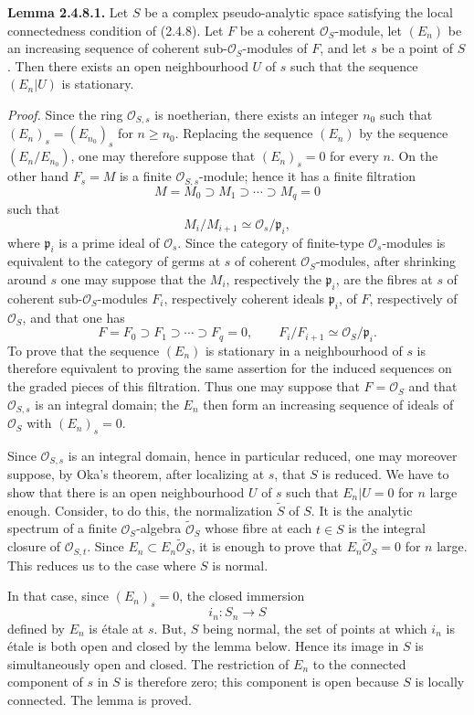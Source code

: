 \textbf{Lemma 2.4.8.1.} Let $S$ be a complex pseudo-analytic space satisfying the local connectedness condition of (2.4.8). Let $F$ be a coherent $\mathcal O_S$-module, let $(E_n)$ be an increasing sequence of coherent sub-$\mathcal O_S$-modules of $F$, and let $s$ be a point of $S$. Then there exists an open neighbourhood $U$ of $s$ such that the sequence $(E_n|U)$ is stationary.

\emph{Proof.} Since the ring $\mathcal O_{S,s}$ is noetherian, there exists an integer $n_0$ such that $(E_n)_s=(E_{n_0})_s$ for $n\geq n_0$. Replacing the sequence $(E_n)$ by the sequence $(E_n/E_{n_0})$, one may therefore suppose that $(E_n)_s=0$ for every $n$. On the other hand $F_s=M$ is a finite $\mathcal O_{S,s}$-module; hence it has a finite filtration
\[
 M=M_0\supset M_1\supset\cdots\supset M_q=0
\]
such that
\[
 M_i/M_{i+1}\simeq \mathcal O_s/\mathfrak p_i,
\]
where $\mathfrak p_i$ is a prime ideal of $\mathcal O_s$. Since the category of finite-type $\mathcal O_s$-modules is equivalent to the category of germs at $s$ of coherent $\mathcal O_S$-modules, after shrinking around $s$ one may suppose that the $M_i$, respectively the $\mathfrak p_i$, are the fibres at $s$ of coherent sub-$\mathcal O_S$-modules $F_i$, respectively coherent ideals $\mathfrak p_i$, of $F$, respectively of $\mathcal O_S$, and that one has
\[
 F=F_0\supset F_1\supset\cdots\supset F_q=0,
 \qquad F_i/F_{i+1}\simeq\mathcal O_S/\mathfrak p_i.
\]
To prove that the sequence $(E_n)$ is stationary in a neighbourhood of $s$ is therefore equivalent to proving the same assertion for the induced sequences on the graded pieces of this filtration. Thus one may suppose that $F=\mathcal O_S$ and that $\mathcal O_{S,s}$ is an integral domain; the $E_n$ then form an increasing sequence of ideals of $\mathcal O_S$ with $(E_n)_s=0$.

Since $\mathcal O_{S,s}$ is an integral domain, hence in particular reduced, one may moreover suppose, by Oka's theorem, after localizing at $s$, that $S$ is reduced. We have to show that there is an open neighbourhood $U$ of $s$ such that $E_n|U=0$ for $n$ large enough. Consider, to do this, the normalization $\widetilde S$ of $S$. It is the analytic spectrum of a finite $\mathcal O_S$-algebra $\widetilde{\mathcal O}_S$ whose fibre at each $t\in S$ is the integral closure of $\mathcal O_{S,t}$. Since $E_n\subset E_n\widetilde{\mathcal O}_S$, it is enough to prove that $E_n\widetilde{\mathcal O}_S=0$ for $n$ large. This reduces us to the case where $S$ is normal.

In that case, since $(E_n)_s=0$, the closed immersion
\[
 i_n:S_n\longrightarrow S
\]
defined by $E_n$ is étale at $s$. But, $S$ being normal, the set of points at which $i_n$ is étale is both open and closed by the lemma below. Hence its image in $S$ is simultaneously open and closed. The restriction of $E_n$ to the connected component of $s$ in $S$ is therefore zero; this component is open because $S$ is locally connected. The lemma is proved.

